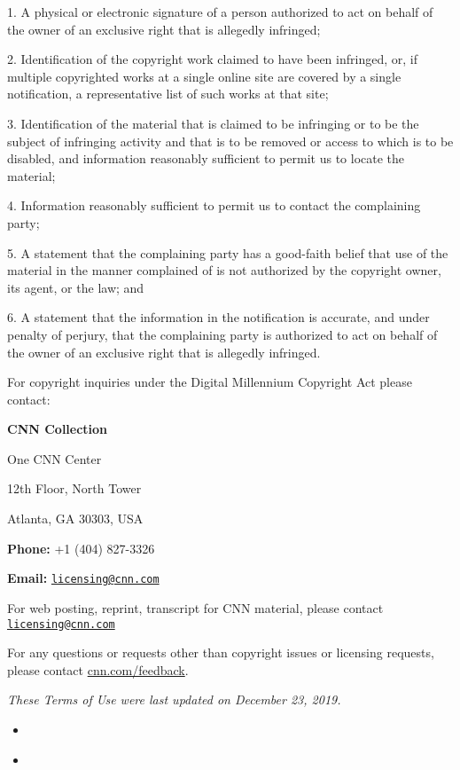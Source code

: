 1. A physical or electronic signature of a person authorized to act on
behalf of the owner of an exclusive right that is allegedly infringed;

2. Identification of the copyright work claimed to have been infringed,
or, if multiple copyrighted works at a single online site are covered by
a single notification, a representative list of such works at that site;

3. Identification of the material that is claimed to be infringing or to
be the subject of infringing activity and that is to be removed or
access to which is to be disabled, and information reasonably sufficient
to permit us to locate the material;

4. Information reasonably sufficient to permit us to contact the
complaining party;

5. A statement that the complaining party has a good-faith belief that
use of the material in the manner complained of is not authorized by the
copyright owner, its agent, or the law; and

6. A statement that the information in the notification is accurate, and
under penalty of perjury, that the complaining party is authorized to
act on behalf of the owner of an exclusive right that is allegedly
infringed.

For copyright inquiries under the Digital Millennium Copyright Act
please contact:

\textbf{CNN Collection}

One CNN Center

12th Floor, North Tower

Atlanta, GA 30303, USA

\textbf{Phone:} +1 (404) 827-3326

\textbf{Email:}
\href{mailto:licensing@cnn.com}{\nolinkurl{licensing@cnn.com}}

For web posting, reprint, transcript for CNN material, please contact
\href{mailto:licensing@cnn.com}{\nolinkurl{licensing@cnn.com}}

For any questions or requests other than copyright issues or licensing
requests, please contact
\href{http://www.cnn.com/feedback}{cnn.com/feedback}.

\emph{These Terms of Use were last updated on December 23, 2019.}

\begin{itemize}
\item
\end{itemize}

\begin{itemize}
\item
\end{itemize}

